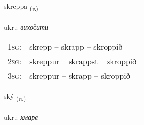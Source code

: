 \documentclass[frontgrid, backgrid]{flacards}\usepackage[]{graphicx}\usepackage[]{xcolor}
\begin{document}
\renewcommand{\flhead}{\vskip5pt \fboxsep=0pt {\small\bfseries\footnotesize Sagnorð | дієслово}}
\renewcommand{\fcfoot}{\vskip5pt \fboxsep=0pt \hspace{2pt}{\small\bfseries\footnotesize 3K}}

\renewcommand{\blhead}{\vskip5pt {\small\bfseries\footnotesize Sagnorð | дієслово }}
\renewcommand{\bcfoot}{\vskip5pt \hspace{2pt}{\small\bfseries\footnotesize 3K}}


{skreppa \small{\textsubscript{(\textit{v.})}} \\[1ex] %
\textphonetic{[skrɛhpa]} \\
ukr.: \emph{виходити} \\  [2ex]
\renewcommand*{\arraystretch}{0.8}
\begin{tabular}{p{1cm}l}
\textsc{1sg}: & skrepp -- skrapp -- skroppið \\ 
\textsc{2sg}: & skreppur -- skrappst -- skroppið \\ 
\textsc{3sg}: & skreppur -- skrapp -- skroppið \\ 
\end{tabular}
}

\renewcommand{\flhead}{\vskip5pt \fboxsep=0pt {\small\bfseries\footnotesize Nafnorð | іменник}}
\renewcommand{\fcfoot}{\vskip5pt \fboxsep=0pt \hspace{2pt}{\small\bfseries\footnotesize 3K}}

\renewcommand{\blhead}{\vskip5pt {\small\bfseries\footnotesize Nafnorð | іменник }}
\renewcommand{\bcfoot}{\vskip5pt \hspace{2pt}{\small\bfseries\footnotesize 3K}}


{ský \small{\textsubscript{(\textit{n.})}} \\[1ex] %
\textphonetic{[sciː]} \\
ukr.: \emph{хмара} \\  [2ex]
\renewcommand*{\arraystretch}{0.8}
}
\end{document}
